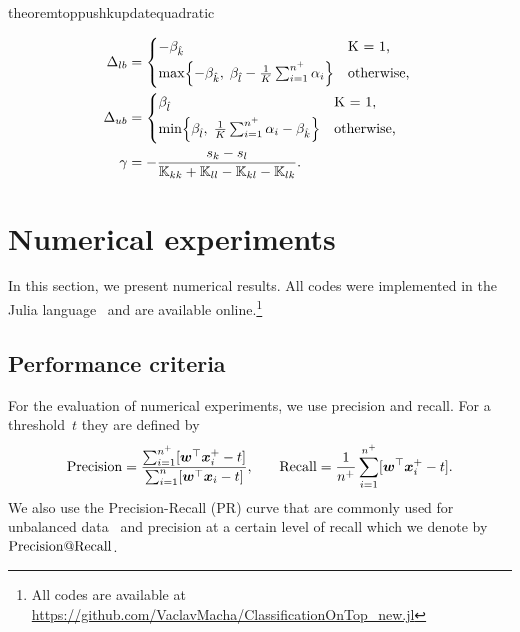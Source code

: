 \begin{restatable}{theorem}{toppushkupdatequadratic}
\begin{itemize}
    \begin{align*}
      \Delta_{lb} & = 
        \begin{cases*}
          -\beta_{\hat k} & K = 1, \\
          \max \Brac[c]{- \beta_{\hat k},\; \beta_{\hat l} - \frac{1}{K} \sum_{i = 1}^{n^+} \alpha_i} & \textrm{otherwise},
        \end{cases*} \\
      \Delta_{ub} & = 
        \begin{cases*}
          \beta_{\hat l} & K = 1, \\
          \min \Brac[c]{\beta_{\hat l},\; \frac{1}{K} \sum_{i = 1}^{n^+} \alpha_i - \beta_{\hat k}} & \textrm{otherwise},
        \end{cases*} \\
      \gamma & = -\frac{s_k - s_l}{\K_{kk} + \K_{ll} - \K_{kl} - \K_{lk}}.
    \end{align*}
  \end{itemize}
\end{restatable}

\section{Numerical experiments}\label{sec:Numerical experiments}

In this section, we present numerical results. All codes were implemented in the Julia language~\cite{bezanson2017julia} and are available online.\footnote{All codes are available at \url{https://github.com/VaclavMacha/ClassificationOnTop_new.jl}}

\subsection{Performance criteria}

For the evaluation of numerical experiments, we use precision and recall. For a threshold~$t$ they are defined by
\begin{equation}\label{eq:prec_rec}
  \begin{alignedat}{2}
      \operatorname*{Precision}
      & = \frac{\sum_{i = 1}^{n^+} [\bm{w}^{\top}\bm{x}^+_{i} - t]}{\sum_{i = 1}^{n} [\bm{w}^{\top}\bm{x}_{i} - t]}, & \qquad
      \operatorname*{Recall}
      & = \frac{1}{n^+} \sum_{i = 1}^{n^+} [\bm{w}^{\top}\bm{x}^+_{i} - t].
  \end{alignedat}
\end{equation}
We also use the Precision-Recall (PR) curve that are commonly used for unbalanced data~\cite{davis2006relationship} and precision at a certain level of recall which we denote by~$\operatorname*{Precision@Recall}$.


